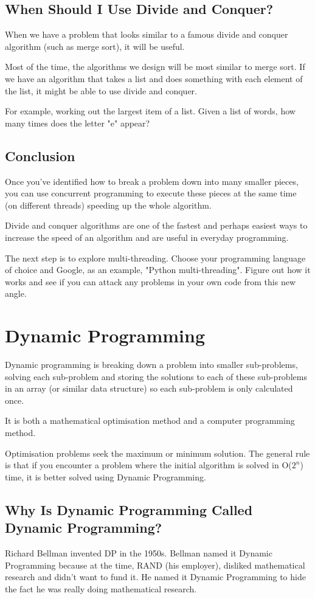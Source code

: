 \documentclass{article}
\begin{document}
\newpage
\subsection{When Should I Use Divide and Conquer?}
When we have a problem that looks similar to a famous divide and conquer algorithm (such as merge sort), it will be useful.

Most of the time, the algorithms we design will be most similar to merge sort. If we have an algorithm that takes a list and does something with each element of the list, it might be able to use divide and conquer. 

For example, working out the largest item of a list. Given a list of words, how many times does the letter "e" appear? 
\newpage
\subsection{Conclusion}
Once you've identified how to break a problem down into many smaller pieces, you can use concurrent programming to execute these pieces at the same time (on different threads) speeding up the whole algorithm. 

Divide and conquer algorithms are one of the fastest and perhaps easiest ways to increase the speed of an algorithm and are useful in everyday programming.

The next step is to explore multi-threading. Choose your programming language of choice and Google, as an example, "Python multi-threading". Figure out how it works and see if you can attack any problems in your own code from this new angle. 
\newpage
\section{Dynamic Programming}
Dynamic programming is breaking down a problem into smaller sub-problems, solving each sub-problem and storing the solutions to each of these sub-problems in an array (or similar data structure) so each sub-problem is only calculated once. 

It is both a mathematical optimisation method and a computer programming method.

Optimisation problems seek the maximum or minimum solution. The general rule is that if you encounter a problem where the initial algorithm is solved in O($2^n$) time, it is better solved using Dynamic Programming.
\newpage
\subsection{Why Is Dynamic Programming Called Dynamic Programming?}
Richard Bellman invented DP in the 1950s. Bellman named it Dynamic Programming because at the time, RAND (his employer), disliked mathematical research and didn't want to fund it. He named it Dynamic Programming to hide the fact he was really doing mathematical research.
\end{document}
